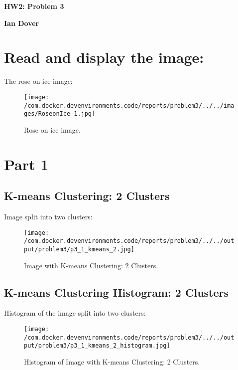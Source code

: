 \documentclass{article}%
\begin{document}
%
\normalsize%
\pagestyle{header}%
\begin{minipage}{\textwidth}%
\centering%
\begin{Large}%
\textbf{HW2: Problem 3}%
\end{Large}%
\linebreak%
\begin{large}%
\textbf{Ian Dover}%
\end{large}%
\end{minipage}%
\section{Read and display the image:}%
\label{sec:Readanddisplaytheimage}%
The rose on ice image:%


\begin{figure}[h!]%
\centering%
\texttt{[image: /com.docker.devenvironments.code/reports/problem3/../../images/RoseonIce-1.jpg]}%
\caption{Rose on ice image.}%
\end{figure}

%
\section{Part 1}%
\label{sec:Part1}%
\subsection{K{-}means Clustering: 2 Clusters}%
\label{subsec:K{-}meansClustering2Clusters}%
Image split into two clusters:%


\begin{figure}[h!]%
\centering%
\texttt{[image: /com.docker.devenvironments.code/reports/problem3/../../output/problem3/p3\_1\_kmeans\_2.jpg]}%
\caption{Image with K{-}means Clustering: 2 Clusters.}%
\end{figure}

%
\subsection{K{-}means Clustering Histogram: 2 Clusters}%
\label{subsec:K{-}meansClusteringHistogram2Clusters}%
Histogram of the image split into two clusters:%


\begin{figure}[h!]%
\centering%
\texttt{[image: /com.docker.devenvironments.code/reports/problem3/../../output/problem3/p3\_1\_kmeans\_2\_histogram.jpg]}%
\caption{Histogram of Image with K{-}means Clustering: 2 Clusters.}%
\end{figure}

%
\end{document}
